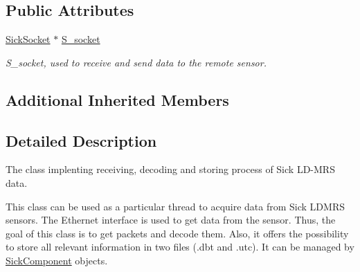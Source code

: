 \subsection*{Public Attributes}
\begin{DoxyCompactItemize}
\item 
\hypertarget{classpacpus_1_1SickLDMRSSensor_a82b3667ed7a09898e73287d7ba620eb3}{\hyperlink{classpacpus_1_1SickSocket}{Sick\-Socket} $\ast$ \hyperlink{classpacpus_1_1SickLDMRSSensor_a82b3667ed7a09898e73287d7ba620eb3}{S\-\_\-socket}}\label{classpacpus_1_1SickLDMRSSensor_a82b3667ed7a09898e73287d7ba620eb3}

\begin{DoxyCompactList}\small\item\em S\-\_\-socket, used to receive and send data to the remote sensor. \end{DoxyCompactList}\end{DoxyCompactItemize}
\subsection*{Additional Inherited Members}


\subsection{Detailed Description}
The class implenting receiving, decoding and storing process of Sick L\-D-\/\-M\-R\-S data. 

This class can be used as a particular thread to acquire data from Sick L\-D\-M\-R\-S sensors. The Ethernet interface is used to get data from the sensor. Thus, the goal of this class is to get packets and decode them. Also, it offers the possibility to store all relevant information in two files (.dbt and .utc). It can be managed by \hyperlink{classpacpus_1_1SickComponent}{Sick\-Component} objects. 


